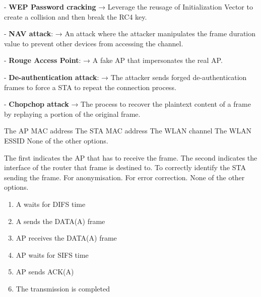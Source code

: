 \begin{questions}
    \begin{solution}
        - \textbf{WEP Password cracking} → Leverage the reusage of Initialization Vector to create a collision and then break the RC4 key.

        - \textbf{NAV attack}: → An attack where the attacker manipulates the frame duration value to prevent other devices from accessing the channel.

        - \textbf{Rouge Access Point}: → A fake AP that impersonates the real AP.

        - \textbf{De-authentication attack}: → The attacker sends forged de-authentication frames to force a STA to repeat the connection process.

        - \textbf{Chopchop attack} → The process to recover the plaintext content of a frame by replaying a portion of the original frame.
    \end{solution}



    \begin{checkboxes}
        \CorrectChoice The AP MAC address
        \CorrectChoice The STA MAC address
        \CorrectChoice The WLAN channel
        \choice The WLAN ESSID
        \choice None of the other options.
    \end{checkboxes}



    \begin{checkboxes}
        \CorrectChoice The first indicates the AP that has to receive the frame. The second indicates the interface of the router that frame is destined to.
        \choice To correctly identify the STA sending the frame.
        \choice For anonymisation.
        \choice For error correction.
        \choice None of the other options.
    \end{checkboxes}

    \begin{solution}
        \begin{enumerate}
            \item A waits for DIFS time
            \item A sends the DATA(A) frame
            \item AP receives the DATA(A) frame
            \item AP waits for SIFS time
            \item AP sends ACK(A)
            \item The transmission is completed
        \end{enumerate}
    \end{solution}


\end{questions}
